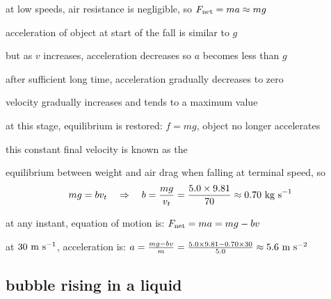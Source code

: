 \cmt at low speeds, air resistance is negligible, so $F_\text{net} =ma \approx mg$

acceleration of object at start of the fall is similar to $g$

but as $v$ increases, acceleration decreases so $a$ becomes less than $g$

\cmt after sufficient long time, acceleration gradually decreases to zero

velocity gradually increases and tends to a maximum value

at this stage, equilibrium is restored: $f=mg$, object no longer accelerates

this constant final velocity is known as the 



\begin{soln}equilibrium between weight and air drag when falling at terminal speed, so
\begin{equation*}
	mg = bv_t \quad \Rightarrow \quad b = \frac{mg}{v_t} = \frac{5.0\times9.81}{70} \approx 0.70 \text{ kg s}^{-1}
\end{equation*}

at any instant, equation of motion is: $F_\text{net} = ma = mg - bv$

at $30\text{ m s$^{-1}$}$, acceleration is: $a = \frac{mg-bv}{m} = \frac{5.0\times9.81-0.70\times30}{5.0} \approx 5.6 \text{ m s$^{-2}$}$ \end{soln}

\subsection*{bubble rising in a liquid}

\begin{marginfigure}
	\vspace*{-16pt}
	\centering
	\vspace*{-16pt}
\end{marginfigure}


